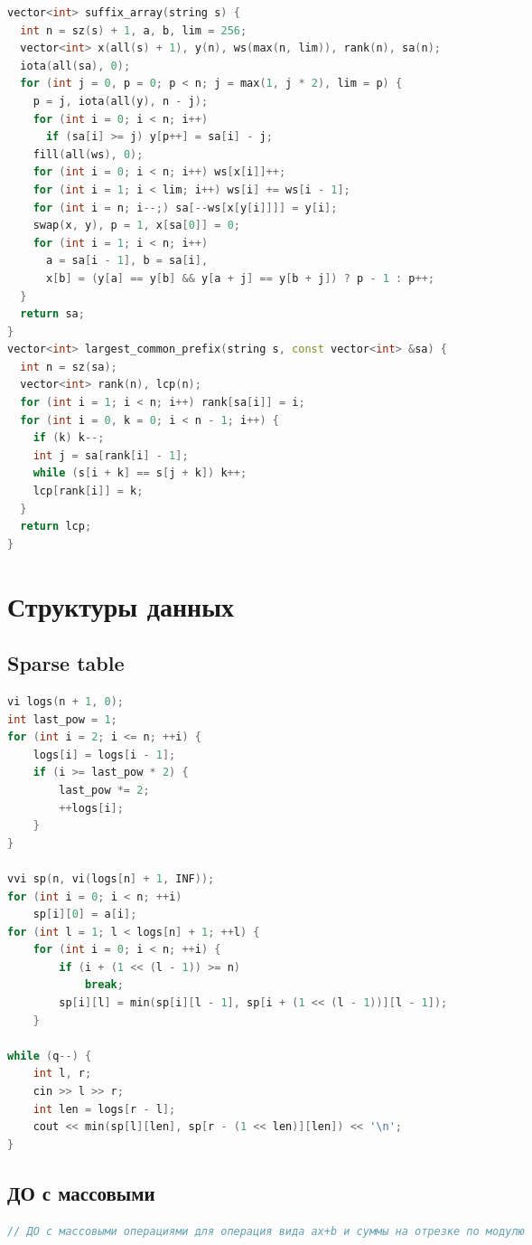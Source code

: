 \documentclass[10pt,a4paper,landscape,twosided]{extarticle}
\begin{document}
\begin{multicols}{3}
\begin{lstlisting}[language=C++]
vector<int> suffix_array(string s) {
  int n = sz(s) + 1, a, b, lim = 256;
  vector<int> x(all(s) + 1), y(n), ws(max(n, lim)), rank(n), sa(n);
  iota(all(sa), 0);
  for (int j = 0, p = 0; p < n; j = max(1, j * 2), lim = p) {
    p = j, iota(all(y), n - j);
    for (int i = 0; i < n; i++)
      if (sa[i] >= j) y[p++] = sa[i] - j;
    fill(all(ws), 0);
    for (int i = 0; i < n; i++) ws[x[i]]++;
    for (int i = 1; i < lim; i++) ws[i] += ws[i - 1];
    for (int i = n; i--;) sa[--ws[x[y[i]]]] = y[i];
    swap(x, y), p = 1, x[sa[0]] = 0;
    for (int i = 1; i < n; i++)
      a = sa[i - 1], b = sa[i],
      x[b] = (y[a] == y[b] && y[a + j] == y[b + j]) ? p - 1 : p++;
  }
  return sa;
}
vector<int> largest_common_prefix(string s, const vector<int> &sa) {
  int n = sz(sa);
  vector<int> rank(n), lcp(n);
  for (int i = 1; i < n; i++) rank[sa[i]] = i;
  for (int i = 0, k = 0; i < n - 1; i++) {
    if (k) k--;
    int j = sa[rank[i] - 1];
    while (s[i + k] == s[j + k]) k++;
    lcp[rank[i]] = k;
  }
  return lcp;
}
\end{lstlisting}

\section{Структуры данных}

\subsection{Sparse table}
\begin{lstlisting}[language=C++]
vi logs(n + 1, 0);
int last_pow = 1;
for (int i = 2; i <= n; ++i) {
    logs[i] = logs[i - 1];
    if (i >= last_pow * 2) {
        last_pow *= 2;
        ++logs[i];
    }
}

vvi sp(n, vi(logs[n] + 1, INF));
for (int i = 0; i < n; ++i)
    sp[i][0] = a[i];
for (int l = 1; l < logs[n] + 1; ++l) {
    for (int i = 0; i < n; ++i) {
        if (i + (1 << (l - 1)) >= n)
            break;
        sp[i][l] = min(sp[i][l - 1], sp[i + (1 << (l - 1))][l - 1]);
    }

while (q--) {
    int l, r;
    cin >> l >> r;
    int len = logs[r - l];
    cout << min(sp[l][len], sp[r - (1 << len)][len]) << '\n';
}
\end{lstlisting}

\subsection{ДО с массовыми}
\begin{lstlisting}[language=C++]
// ДО с массовыми операциями для операция вида ax+b и суммы на отрезке по модулю


\end{lstlisting}
\end{multicols}
\end{document}
